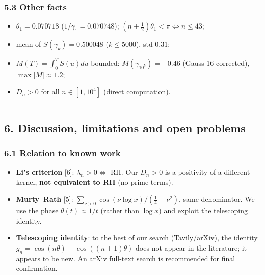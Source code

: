 \documentclass[
]{article}
\providecommand{\tightlist}{%
  \setlength{\itemsep}{0pt}\setlength{\parskip}{0pt}}
\begin{document}
\hypertarget{other-facts}{%
\subsubsection{5.3 Other facts}\label{other-facts}}

\begin{itemize}
\tightlist
\item
  \(\theta_1 = 0.070718\) (\(1/\gamma_1 = 0.070748\));
  \((n+\tfrac12)\theta_1 < \pi \iff n \le 43\);
\item
  mean of \(S(\gamma_k) = 0.500048\) (\(k\le 5000\)), std 0.31;
\item
  \(M(T) = \int_0^T S(u)du\) bounded: \(M(\gamma_{10^5}) = -0.46\)
  (Gauss-16 corrected), \(\max|M| \approx 1.2\);
\item
  \(D_n > 0\) for all \(n \in [1, 10^4]\) (direct computation).
\end{itemize}

\begin{center}\rule{0.5\linewidth}{0.5pt}\end{center}

\hypertarget{discussion-limitations-and-open-problems}{%
\subsection{6. Discussion, limitations and open
problems}\label{discussion-limitations-and-open-problems}}

\hypertarget{relation-to-known-work}{%
\subsubsection{6.1 Relation to known
work}\label{relation-to-known-work}}

\begin{itemize}
\tightlist
\item
  \textbf{Li's criterion} {[}6{]}: \(\lambda_n > 0 \iff\) RH. Our
  \(D_n > 0\) is a positivity of a different kernel, \textbf{not
  equivalent to RH} (no prime terms).
\item
  \textbf{Murty--Rath} {[}5{]}:
  \(\sum_{\nu>0}\cos(\nu\log x)/(\tfrac14+\nu^2)\), same denominator. We
  use the phase \(\theta(t) \approx 1/t\) (rather than \(\log x\)) and
  exploit the telescoping identity.
\item
  \textbf{Telescoping identity}: to the best of our search
  (Tavily/arXiv), the identity \(g_n = \cos(n\theta)-\cos((n+1)\theta)\)
  does not appear in the literature; it appears to be new. An arXiv
  full-text search is recommended for final confirmation.
\end{itemize}
\end{document}
